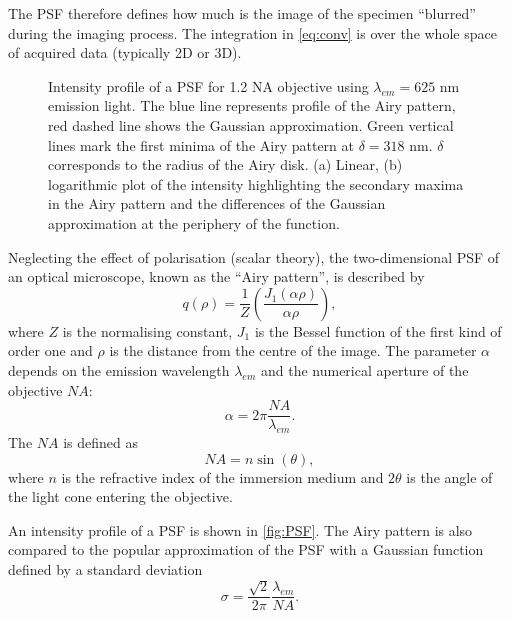 The PSF therefore defines how much is the image of the specimen ``blurred'' during the imaging process. The integration in \autoref{eq:conv} is over the whole space of acquired data (typically 2D or 3D). 

\begin{figure}[!bht]
	\centering
	\newcommand{\wf}{.48\textwidth}
	\caption{Intensity profile of a PSF for 1.2 NA objective using $\lambda_{em}=625$ nm emission light. The blue line represents profile of the Airy pattern, red dashed line shows the Gaussian approximation. Green vertical lines mark the first minima of the Airy pattern at $\delta=318$ nm. $\delta$ corresponds to the radius of the Airy disk. (a) Linear, (b) logarithmic plot of the intensity highlighting the secondary maxima in the Airy pattern and the differences of the Gaussian approximation at the periphery of the function.}
	\label{fig:PSF}
\end{figure}
%
Neglecting the effect of polarisation (scalar theory), the two-dimensional PSF of an optical microscope, known as the ``Airy pattern'', is described by
%
\begin{equation}
	q(\rho)=\frac{1}{Z}\left(\frac{J_1(\alpha \rho)}{\alpha \rho}\right),
\end{equation}
%
where $Z$ is the normalising constant, $J_1$ is the Bessel function of the first kind of order one and $\rho$ is the distance from the centre of the image. The parameter $\alpha$ depends on the emission wavelength $\lambda_{em}$ and the numerical aperture of the objective $\unit{NA}$:
%
\begin{equation}
	\alpha=2\pi\frac{\unit{NA}}{\lambda_{em}}.
\end{equation}
% 
The $\unit{NA}$ is defined as
\begin{equation}
	\unit{NA}=n\sin(\theta),
	\label{eq:NA}
\end{equation}
%
where $n$ is the refractive index of the immersion medium and $2\theta$ is the angle of the light cone entering the objective.

An intensity profile of a PSF is shown in \autoref{fig:PSF}. The Airy pattern is also compared to the popular approximation of the PSF with a Gaussian function \cite{Zhang2007} defined by a standard deviation
%
\begin{equation}
	\sigma=\frac{\sqrt{2}}{2\pi}\frac{\lambda_{em}}{\unit{NA}}.
\end{equation}

